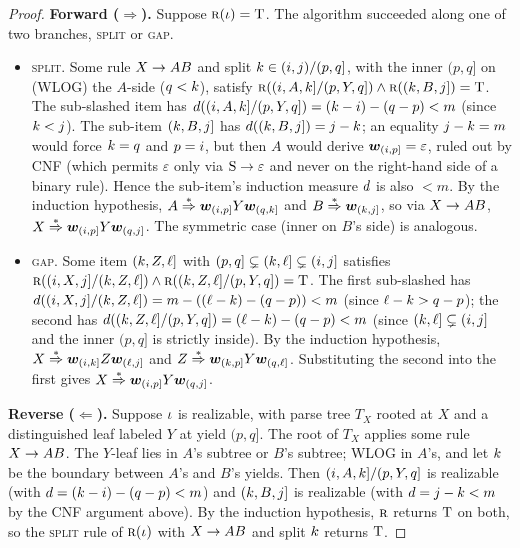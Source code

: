 \documentclass{article}
\begin{document}
\begin{proof}
    \textbf{Forward ($\Rightarrow$).} Suppose ${\textsc{r}}({{ \iota}}) = {\mathbin{\mathrm{T}}}$. The algorithm succeeded along one of two branches, \textsc{split} or \textsc{gap}.
    \begin{itemize}[noitemsep,topsep=0pt,leftmargin=15pt,parsep=0pt,partopsep=0pt]
        \item \textsc{split.} Some rule ${{ X \rightarrow AB}}$ and split ${{ k}} \in ({{ i}}, {{ j}})/(p, q]$, with the inner $(p, q]$ on (WLOG) the $A$-side ($q < {{ k}}$), satisfy ${\textsc{r}}(({{ i}}, A, {{ k}}] / (p, Y, q]) \land {\textsc{r}}(({{ k}}, B, {{ j}}]) = {\mathbin{\mathrm{T}}}$. 
        The sub-slashed item has ${d}(({{ i}}, A, {{ k}}] / (p, Y, q]) = ({{ k}} - {{ i}}) - (q - p) < m$ (since ${{ k}} < {{ j}}$). 
        The sub-item $({{ k}}, B, {{ j}}]$ has ${d}(({{ k}}, B, {{ j}}]) = {{ j}} - {{ k}}$; an equality ${{ j}} - {{ k}} = m$ would force ${{ k}} = q$ and $p = {{ i}}$, but then $A$ would derive ${{\boldsymbol{w}}}_{({{ i}}, p]} = \varepsilon$, ruled out by CNF (which permits $\varepsilon$ only via ${{ {{ \mathrm{S}}} \rightarrow {{ \varepsilon}}}}$ and never on the right-hand side of a binary rule).
        Hence the sub-item's induction measure ${d}$ is also $< m$. By the induction hypothesis, $A \mathrel{{\overset{*}{\Rightarrow}}} {{\boldsymbol{w}}}_{({{ i}}, p]} Y {{\boldsymbol{w}}}_{(q, {{ k}}]}$ and $B \mathrel{{\overset{*}{\Rightarrow}}} {{\boldsymbol{w}}}_{({{ k}}, {{ j}}]}$, so via ${{ X \rightarrow AB}}$, $X \mathrel{{\overset{*}{\Rightarrow}}} {{\boldsymbol{w}}}_{({{ i}}, p]} Y {{\boldsymbol{w}}}_{(q, {{ j}}]}$. The symmetric case (inner on $B$'s side) is analogous.
        \item \textsc{gap.} Some item $({{ k}}, Z, {{\ell}}]$ with $(p, q] \subsetneq ({{ k}}, {{\ell}}] \subsetneq ({{ i}}, {{ j}}]$ satisfies ${\textsc{r}}(({{ i}}, X, {{ j}}] / ({{ k}}, Z, {{\ell}}]) \land {\textsc{r}}(({{ k}}, Z, {{\ell}}] / (p, Y, q]) = {\mathbin{\mathrm{T}}}$. 
        The first sub-slashed has ${d}(({{ i}}, X, {{ j}}] / ({{ k}}, Z, {{\ell}}]) = m - (({{\ell}} - {{ k}}) - (q - p)) < m$ (since ${{\ell}} - {{ k}} > q - p$); the second has ${d}(({{ k}}, Z,{{\ell}}] / (p, Y, q]) = ({{\ell}} - {{ k}}) - (q - p) < m$ (since $({{ k}}, {{\ell}}] \subsetneq ({{ i}}, {{ j}}]$ and the inner $(p, q]$ is strictly inside). 
        By the induction hypothesis, $X \mathrel{{\overset{*}{\Rightarrow}}} {{\boldsymbol{w}}}_{({{ i}}, {{ k}}]} Z {{\boldsymbol{w}}}_{({{\ell}}, {{ j}}]}$ and $Z \mathrel{{\overset{*}{\Rightarrow}}} {{\boldsymbol{w}}}_{({{ k}}, p]} Y {{\boldsymbol{w}}}_{(q, {{\ell}}]}$. Substituting the second into the first gives $X \mathrel{{\overset{*}{\Rightarrow}}} {{\boldsymbol{w}}}_{({{ i}}, p]} Y {{\boldsymbol{w}}}_{(q, {{ j}}]}$.
    \end{itemize}
    
    \textbf{Reverse ($\Leftarrow$).} Suppose ${{ \iota}}$ is realizable, with parse tree $T_X$ rooted at $X$ and a distinguished leaf labeled $Y$ at yield $(p, q]$. The root of $T_X$ applies some rule ${{ X \rightarrow AB}}$. The $Y$-leaf lies in $A$'s subtree or $B$'s subtree; WLOG in $A$'s, and let ${{ k}}$ be the boundary between $A$'s and $B$'s yields. Then $({{ i}}, A, {{ k}}] / (p, Y, q]$ is realizable (with ${d} = ({{ k}} - {{ i}}) - (q - p) < m$) and $({{ k}}, B, {{ j}}]$ is realizable (with ${d} = {{ j}} - {{ k}} < m$ by the CNF argument above). By the induction hypothesis, ${\textsc{r}}$ returns ${\mathbin{\mathrm{T}}}$ on both, so the \textsc{split} rule of ${\textsc{r}}({{ \iota}})$ with ${{ X \rightarrow AB}}$ and split ${{ k}}$ returns ${\mathbin{\mathrm{T}}}$.
    

\end{proof}
\end{document}
